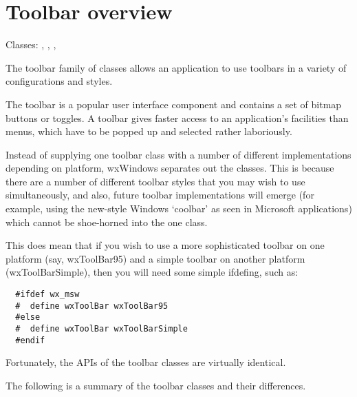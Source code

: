 \section{Toolbar overview}\label{wxtoolbaroverview}

Classes: , ,\rtfsp
{}, 

The toolbar family of classes allows an application to use toolbars
in a variety of configurations and styles.

The toolbar is a popular user interface component and contains a set of bitmap
buttons or toggles. A toolbar gives faster access to an application's facilities than
menus, which have to be popped up and selected rather laboriously.

Instead of supplying one toolbar class with a number
of different implementations depending on platform, wxWindows separates
out the classes. This is because there are a number of different toolbar
styles that you may wish to use simultaneously, and also, future
toolbar implementations will emerge (for example, using the
new-style Windows `coolbar' as seen in Microsoft applications) which
cannot be shoe-horned into the one class.

This does mean that if you wish to use a more sophisticated toolbar
on one platform (say, wxToolBar95) and a simple toolbar on another
platform (wxToolBarSimple), then you will need some simple ifdefing, such as:

\begin{verbatim}
  #ifdef wx_msw
  #  define wxToolBar wxToolBar95
  #else
  #  define wxToolBar wxToolBarSimple
  #endif
\end{verbatim}

Fortunately, the APIs of the toolbar classes are virtually identical.

The following is a summary of the toolbar classes and their differences.

